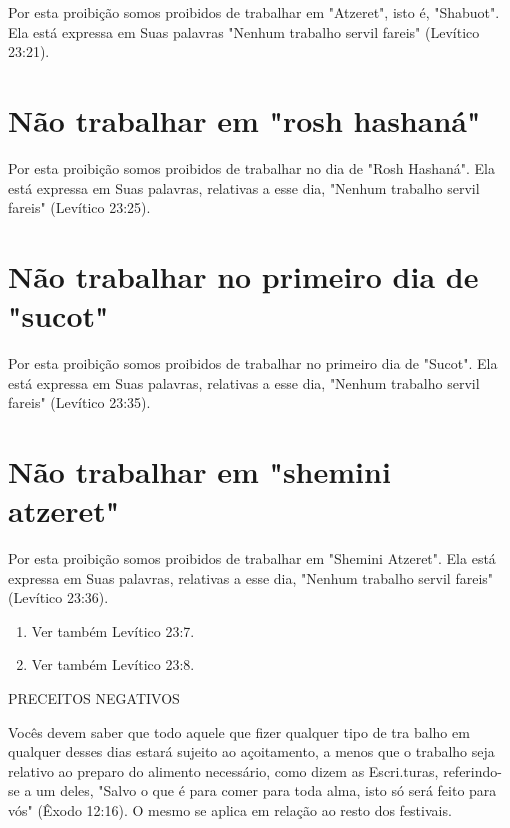 \begin{itemize}
\begin{enumrate}
\begin{itemize}
\begin{itemize}
\begin{itemize}
Por esta proibição somos proibidos de trabalhar em "Atzeret", isto é,
"Shabuot". Ela está expressa em Suas palavras "Nenhum trabalho servil
fa­reis" (Levítico 23:21).

\section{Não trabalhar em "rosh hashaná"}

Por esta proibição somos proibidos de trabalhar no dia de "Rosh
Has­haná". Ela está expressa em Suas palavras, relativas a esse dia,
"Nenhum traba­lho servil fareis" (Levítico 23:25).

\section{Não trabalhar no primeiro dia de "sucot"}

Por esta proibição somos proibidos de trabalhar no primeiro dia de
"Sucot". Ela está expressa em Suas palavras, relativas a esse dia,
"Nenhum tra­balho servil fareis" (Levítico 23:35).

\section{Não trabalhar em "shemini atzeret"}

Por esta proibição somos proibidos de trabalhar em "Shemini Atze­ret".
Ela está expressa em Suas palavras, relativas a esse dia, "Nenhum
trabalho servil fareis" (Levítico 23:36).


\begin{enumerate}
\def\labelenumi{\arabic{enumi}.}
\setcounter{enumi}{439}
\item
 
 Ver também Levítico 23:7.
 
\item
 
 Ver também Levítico 23:8.
 
\end{enumerate}


PRECEITOS NEGATIVOS

Vocês devem saber que todo aquele que fizer qualquer tipo de tra balho
em qualquer desses dias estará sujeito ao açoitamento, a menos que o
trabalho seja relativo ao preparo do alimento necessário, como dizem as
Escri­.turas, referindo-se a um deles, "Salvo o que é
para comer para toda alma, isto só será feito para vós" (Êxodo 12:16). O
mesmo se aplica em relação ao resto dos festivais.


\end{itemize}
\end{itemize}
\end{itemize}
\end{enumrate}
\end{itemize}
